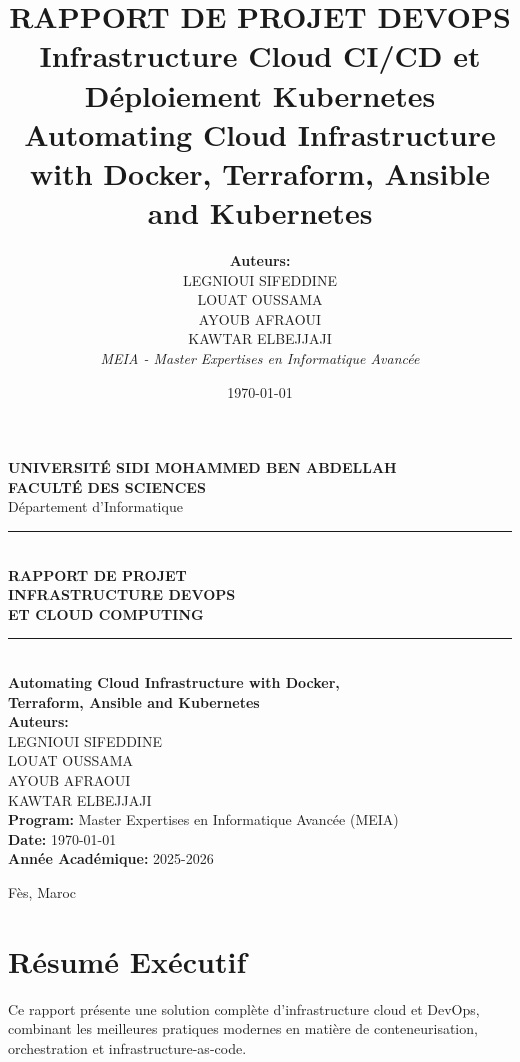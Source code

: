 \documentclass[12pt,a4paper]{report}
\title{
    \textbf{RAPPORT DE PROJET DEVOPS} \\
    \textbf{Infrastructure Cloud CI/CD et Déploiement Kubernetes} \\[1cm]
    {\large Automating Cloud Infrastructure with Docker, Terraform, Ansible and Kubernetes}
}
\author{
    \textbf{Auteurs:} \\
    LEGNIOUI SIFEDDINE \\
    LOUAT OUSSAMA \\
    AYOUB AFRAOUI \\
    KAWTAR ELBEJJAJI \\[1cm]
    \textit{MEIA - Master Expertises en Informatique Avancée}
}
\date{\today}
\begin{document}
\begin{titlepage}
    \centering
    \vspace*{2cm}
    {\Large \textbf{UNIVERSITÉ SIDI MOHAMMED BEN ABDELLAH}} \\[0.5cm]
    {\Large \textbf{FACULTÉ DES SCIENCES}} \\[0.5cm]
    {\Large Département d'Informatique} \\[3cm]
    
    \rule{\linewidth}{1.5pt} \\[0.5cm]
    {\LARGE \textbf{RAPPORT DE PROJET}} \\[0.2cm]
    {\LARGE \textbf{INFRASTRUCTURE DEVOPS}} \\
    {\LARGE \textbf{ET CLOUD COMPUTING}} \\[0.5cm]
    \rule{\linewidth}{1.5pt} \\[2cm]
    
    {\Large \textbf{Automating Cloud Infrastructure with Docker,}} \\
    {\Large \textbf{Terraform, Ansible and Kubernetes}} \\[3cm]
    
    {\large \textbf{Auteurs:}} \\[0.3cm]
    {\large LEGNIOUI SIFEDDINE} \\
    {\large LOUAT OUSSAMA} \\
    {\large AYOUB AFRAOUI} \\
    {\large KAWTAR ELBEJJAJI} \\[2cm]
    
    {\large \textbf{Program:}} Master Expertises en Informatique Avancée (MEIA) \\[1cm]
    
    {\large \textbf{Date:}} \today \\[1cm]
    
    {\large \textbf{Année Académique:} 2025-2026}
    
    \vfill
    
    {\large Fès, Maroc}
\end{titlepage}

\tableofcontents
\newpage

\chapter*{Résumé Exécutif}

Ce rapport présente une solution complète d'infrastructure cloud et DevOps, combinant les meilleures pratiques modernes en matière de conteneurisation, orchestration et infrastructure-as-code.
\end{document}

